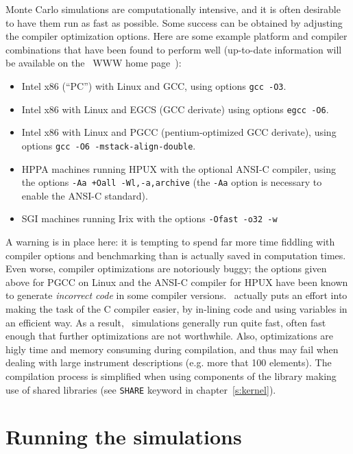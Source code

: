 Monte Carlo simulations are computationally intensive, and it is
often desirable to have them run as fast as possible. Some success can
be obtained by adjusting the compiler optimization
options. Here are some example platform and compiler combinations that
have been found to perform well (up-to-date information will be
available on the \MCS\ WWW home page~\cite{mcstas_webpage}):
\begin{itemize}
\item Intel x86 (``PC'') with Linux and GCC, using options \verb+gcc -O3+.
\item Intel x86 with Linux and EGCS (GCC derivate) using
  options \verb+egcc -O6+.
\item Intel x86 with Linux and PGCC (pentium-optimized GCC derivate), using
  options \verb+gcc -O6 -mstack-align-double+.
\item HPPA machines running HPUX with the optional ANSI-C compiler,
  using the options
  \verb|-Aa +Oall -Wl,-a,archive| (the \verb+-Aa+ option is necessary to
  enable the ANSI-C standard).
\item SGI machines running Irix with the options
  \verb|-Ofast -o32 -w|
\end{itemize}
A warning is in place here: it is tempting to spend far more time
fiddling with compiler options and benchmarking than is actually saved
in computation times. Even worse, compiler optimizations are notoriously
buggy; the options given above for PGCC on Linux and the ANSI-C compiler
for HPUX have been known to generate \emph{incorrect code} in some
compiler versions. \MCS\ actually puts an effort into making the task of the C compiler
easier, by in-lining code and using variables in an efficient way. As a
result, \MCS\ simulations generally run quite fast, often fast enough
that further optimizations are not worthwhile. Also, optimizations are higly
time and memory consuming during compilation, and thus may fail when dealing
with large instrument descriptions (e.g. more that 100 elements). The compilation process is simplified when using components of the library making use of shared libraries (see \verb+SHARE+ keyword in chapter~\ref{s:kernel}).

\section{Running the simulations}
\label{s:run-sim}

